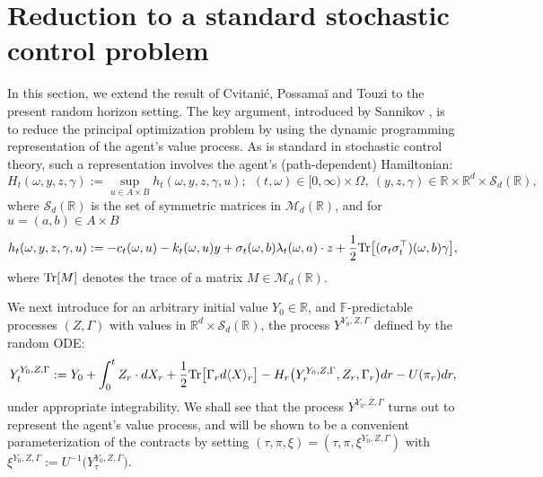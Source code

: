 \documentclass[11pt,a4paper]{article}
\numberwithin{equation}{section}
\def\dbF{\mathbb{F}}
\def\dbR{\mathbb{R}}
\newcommand{\cM}{\mathcal{M}}
\newcommand{\cS}{\mathcal{S}}
\theoremstyle{definition}
\begin{document}
\section{Reduction to a standard stochastic control problem}
\label{sec:mainresult}

In this section, we extend the result of Cvitani\'c, Possama\"i and Touzi \cite{CPT18} to the present random horizon setting. The key argument, introduced by Sannikov \cite{Sannikov08},
is to reduce the principal optimization problem by using the dynamic programming representation of the agent's value process. As is standard in stochastic control theory, such a representation involves the agent's (path-dependent) Hamiltonian:
   \begin{equation} \label{eq:defH}
     H_t(\omega,y,z,\gamma) := \underset{u\in A\times B}{\sup} h_t(\omega,y,z,\gamma,u);~~(t,\omega)\in[0,\infty)\times\Omega,~(y,z,\gamma)\in\dbR\times\dbR^d\times\cS_d(\dbR),
   \end{equation}
   where $\mathcal S_d(\dbR)$ is the set of symmetric matrices in $\cM_{d}(\dbR)$, and for $u=(a,b)\in A\times B$
   \begin{equation} \label{eq:defh}
     h_t(\omega,y,z,\gamma,u):= -c_t(\omega,u)-k_t(\omega,u)y + \sigma_t(\omega,b)\lambda_t(\omega,a)\cdot z + \frac{1}{2}{\rm Tr}\big[(\sigma_t\sigma_t^\top)(\omega,b)\gamma\big],
   \end{equation}
where ${\rm Tr}[M]$ denotes the trace of a matrix $M\in\mathcal M_d(\dbR)$.

We next introduce for an arbitrary initial value $Y_0\in\dbR$, and $\dbF$-predictable processes $(Z,\Gamma)$ with values in $\dbR^d\times\cS_d(\dbR)$, the process $Y^{Y_0,Z,\Gamma}$ defined by the random ODE:
 \begin{equation} \label{def:Y}
           Y^{Y_0,Z,\Gamma}_t 
           :=
           Y_0 + \int_0^tZ_r\cdot dX_r+\frac12{\rm Tr}\big[\Gamma_rd\langle X\rangle_r\big]
                                 -H_r\big(Y^{Y_0,Z,\Gamma}_r,Z_r,\Gamma_r\big)dr-U(\pi_r)dr,
         \end{equation}
  under appropriate integrability. We shall see that the process $Y^{Y_0,Z,\Gamma}$ turns out to represent the agent's value process, 
  and will be shown to be a convenient parameterization of the contracts by setting $(\tau,\pi,\xi)=(\tau,\pi,\xi^{Y_0,Z,\Gamma})$ with $\xi^{Y_0,Z,\Gamma}:=U^{-1}\big(Y^{Y_0,Z,\Gamma}_\tau\big)$. 
\end{document}
